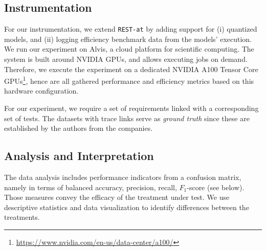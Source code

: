 \documentclass[conference]{IEEEtran}
\begin{document}
\subsection{Instrumentation}\label{sec:instrumentation}
For our instrumentation, we extend \verb|REST-at| by adding support for (i) quantized models, and (ii) logging efficiency benchmark data from the models' execution. We run our experiment on Alvis, a cloud platform for scientific computing. The system is built around NVIDIA GPUs, and allows executing jobs on demand. Therefore, we execute the experiment on a dedicated NVIDIA A100 Tensor Core GPUs\footnote{\url{https://www.nvidia.com/en-us/data-center/a100/}}, hence are all gathered performance and efficiency metrics based on this hardware configuration.

For our experiment, we require a set of requirements linked with a corresponding set of tests. The datasets with trace links serve as \textit{ground truth} since these are established by the authors from the companies.

\subsection{Analysis and Interpretation}\label{sec:analysis}


The data analysis includes performance indicators from a confusion matrix, namely in terms of balanced accuracy, precision, recall, $F_1$-score (see below). Those measures convey the efficacy of the treatment under test. We use descriptive statistics and data visualization to identify differences between the treatments. 
\end{document}
